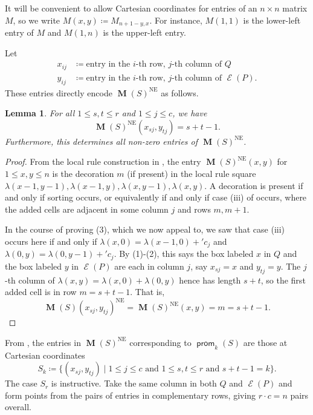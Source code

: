 \documentclass{amsart}
\newtheorem{lemma}[theorem]{Lemma}
\theoremstyle{definition}
\DeclareMathOperator{\NE}{NE}
\DeclareMathOperator{\prom}{\mathsf{prom}}
\DeclareMathOperator{\evacuation}{\mathcal{E}}
\DeclareMathOperator{\PM}{\mathbf{M}}
\newcommand{\vsum}{+'}
\begin{document}
It will be convenient to allow Cartesian coordinates for entries of an $n \times n$ matrix $M$, so we write $M(x,y) \coloneqq M_{n+1-y,x}$. For instance, $M(1,1)$ is the lower-left entry of $M$ and $M(1,n)$ is the upper-left entry.

Let
\begin{align*}
    x_{ij} &\coloneqq \text{entry in the $i$-th row, $j$-th column of $Q$} \\
    y_{ij} &\coloneqq \text{entry in the $i$-th row, $j$-th column of $\evacuation(P)$}.
\end{align*}
These entries directly encode $\PM(S)^{\NE}$ as follows.

\begin{lemma}\label{lem:proof-M}
    For all $1 \leq s, t \leq r$ and $1 \leq j \leq c$, we have
    \begin{equation}
        \PM(S)^{\NE}(x_{sj}, y_{tj}) = s+t-1.
    \end{equation}
    Furthermore, this determines all non-zero entries of $\PM(S)^{\NE}$.
\end{lemma}

\begin{proof}
    From the local rule construction in , the entry $\PM(S)^{\NE}(x, y)$ for $1 \leq x, y \leq n$ is the decoration $m$ (if present) in the local rule square $\lambda(x-1, y-1), \lambda(x-1,y), \lambda(x,y-1), \lambda(x,y)$. A decoration is present if and only if sorting occurs, or equivalently if and only if case (iii) of  occurs, where the added cells are adjacent in some column $j$ and rows $m, m+1$.
    
    In the course of proving (3), which we now appeal to, we saw that case (iii) occurs here if and only if $\lambda(x, 0) = \lambda(x-1,0) \vsum c_j$ and $\lambda(0,y) = \lambda(0,y-1) \vsum c_j$. By (1)-(2), this says the box labeled $x$ in $Q$ and the box labeled $y$ in $\evacuation(P)$ are each in column $j$, say $x_{sj} = x$ and $y_{tj} = y$. The $j$-th column of $\lambda(x,y) = \lambda(x,0) + \lambda(0,y)$ hence has length $s+t$, so the first added cell is in row $m = s+t-1$. That is,
      \[ \PM(S)(x_{sj}, y_{tj})^{\NE} = \PM(S)^{\NE}(x, y) = m = s+t-1. \]
\end{proof}

From , the entries in $\PM(S)^{\NE}$ corresponding to $\prom_k(S)$ are those at Cartesian coordinates
  \[ S_k \coloneqq \{(x_{sj},y_{tj}) \mid 1 \leq j \leq c\text{ and }1 \leq s,t \leq r\text{ and }s+t-1=k\}. \]
The case $S_r$ is instructive. Take the same column in both $Q$ and $\evacuation(P)$ and form points from the pairs of entries in complementary rows, giving $r \cdot c = n$ pairs overall.
\end{document}
